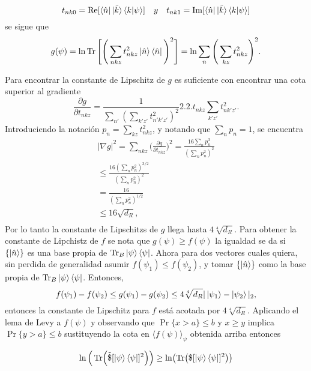 \begin{enumerate}
\begin{equation}
t_{nk0}= \Re [ \bra{\hat{n}} \tilde{\ket{k}} \bra{k}\ket{\psi}] \quad y \quad  t_{nk1}= \Im [ \bra{\hat{n}} \tilde{\ket{k}} \bra{k}\ket{\psi}]
\end{equation}
se sigue que 
\begin{equation}
g(\psi)= \ln \Tr \Bigg[  \Bigg( \sum_{nkz} t_{nkz}^{2}  \ket{\hat{n}} \bra{\hat{n}}  \Bigg)^{2} \Bigg]= \ln \sum_{n} \Bigg( \sum_{kz} t_{nkz}^{2} \Bigg)^{2}.
\end{equation}

Para encontrar la constante de Lipschitz de $g$ es suficiente con encontrar una cota superior al gradiente 
\begin{equation}
\frac{\partial g}{\partial t_{nkz}}=\frac{1}{\sum_{n'} (\sum_{k'z'}t_{n'k'z'}^{2})^{2}} 2.2.t_{nkz} \sum_{k'z'}t_{nk'z'}^{2}.
\end{equation}
Introduciendo la notación $p_{n}=\sum_{kz}t_{nkz}^{2}$, y notando que $\sum_{n} p_{n}=1$, se encuentra 
\begin{multline}
|\nabla g|^{2}= \sum_{nkz} \bigg(\frac{\partial g}{\partial t_{nkz}} \bigg )^{2}= \frac{16 \sum_{n} p_{n}^{3}}{(\sum_{n} p_{n}^{2})^{2}}\\
\leq \frac{16(\sum_{n} p_{n}^{2})^{3/2}}{(\sum_{n} p_{n}^{2})^{2}}\\
=\frac{16}{(\sum_{n} p_{n}^{2})^{1/2}}\\
\leq 16 \sqrt{d_{R}},\\
\end{multline}
Por lo tanto la constante de Lipschitzs de $g$ llega hasta $4 \sqrt[4]{d_{R}}$. Para obtener la constante de Lipchistz de $f$ se nota que $g(\psi) \geq f(\psi)$ la igualdad se da si $ \{ \ket{ \hat{n}} \} $ es una base  propia de $\Tr_{B} \ket{\psi}\bra{\psi}$. Ahora para dos vectores cuales quiera, sin perdida de generalidad asumir $f(\psi_{1}) \leq f(\psi_{2})$, y tomar $ \{ \ket{\hat{n}} \}$ como la base propia de $\Tr_{B} \ket{\psi}\bra{\psi}$. Entonces,
\begin{equation}
f(\psi_{1})- f(\psi_{2})\leq g(\psi_{1})- g(\psi_{2}) \leq 4\sqrt[4]{d_{R}} |\ket{\psi_{1}}-\ket{\psi_{2}}|_{2},
\end{equation}
entonces la constante de Lipschitz para $f$ está acotada por $4\sqrt[4]{d_{R}}$.
Aplicando el lema de Levy a $f(\psi)$ y  observando que $\Pr \{ x>a \} \leq b$ y $x \geq y$ implica $\Pr \{ y>a \} \leq b$  sustituyendo la cota en $\langle f(\psi) \rangle_{\psi}$ obtenida arriba entonces 

\begin{equation}
\ln\Big( \Tr (\tilde{\$}[\ket{\psi}\bra{\psi}]^{2}) \Big) \geq \ln ( \Tr ( \$ [\ket{\psi}\bra{\psi}]^{2}) )
\end{equation}


\end{enumerate}

